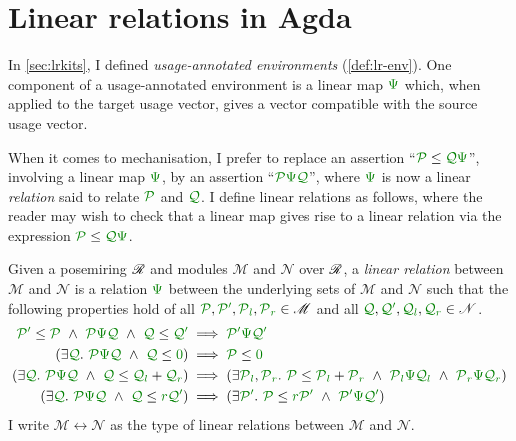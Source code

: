 \section{Linear relations in Agda}\label{sec:lin-rel}

In \cref{sec:lrkits}, I defined \emph{usage-annotated environments}
(\cref{def:lr-env}).
One component of a usage-annotated environment is a linear map $\gr\Psi$ which,
when applied to the target usage vector, gives a vector compatible with the
source usage vector.

When it comes to mechanisation, I prefer to replace an assertion
``$\grP \leq \grQ\gr\Psi$'', involving a linear map $\gr\Psi$, by an assertion
``$\grP\gr\Psi\grQ$'', where $\gr\Psi$ is now a linear \emph{relation} said to
relate $\grP$ and $\grQ$.
I define linear relations as follows, where the reader may wish to check that
a linear map gives rise to a linear relation via the expression
$\grP \leq \grQ\gr\Psi$.

\begin{definition}\label{def:linear-relation}
  Given a posemiring $\mathscr R$ and modules $\mathscr M$ and $\mathscr N$ over
  $\mathscr R$, a \emph{linear relation} between $\mathscr M$ and $\mathscr N$ is
  a relation $\gr\Psi$ between the underlying sets of $\mathscr M$ and
  $\mathscr N$ such that the following properties hold of all
  $\grP, \grPprime, \grPl, \grPr \in \mathscr M$ and all
  $\grQ, \grQprime, \grQl, \grQr \in \mathscr N$.
  \begin{align*}
    \grPprime \leq \grP \land \grP\gr\Psi\grQ \land \grQ \leq \grQprime
    &\implies \grPprime\gr\Psi\grQprime
    \\
    \plr{\exists\grQ.~\grP\gr\Psi\grQ \land \grQ \leq \gr0}
    &\implies \grP \leq \gr0
    \\
    \plr{\exists\grQ.~\grP\gr\Psi\grQ \land \grQ \leq \grQl + \grQr}
    &\implies \plr{\exists\grPl,\grPr.~\grP \leq \grPl + \grPr
      \land \grPl\gr\Psi\grQl \land \grPr\gr\Psi\grQr}
    \\
    \plr{\exists\grQ.~\grP\gr\Psi\grQ \land \grQ \leq \gr r\grQprime}
    &\implies \plr{\exists\grPprime.~\grP \leq \gr r\grPprime
      \land \grPprime\gr\Psi\grQprime}
  \end{align*}
  I write $\mathscr M \rel \mathscr N$ as the type of linear relations between
  $\mathscr M$ and $\mathscr N$.
\end{definition}

